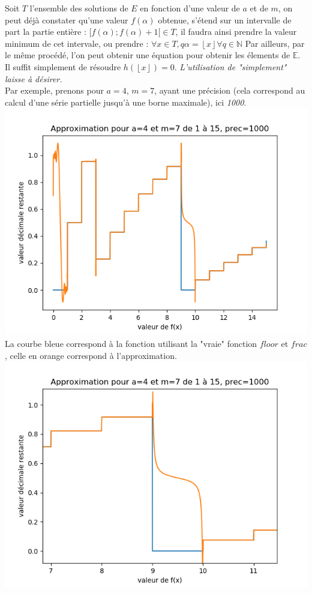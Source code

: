 \documentclass{article}
\begin{document}
Soit $T$ l'ensemble des solutions de $E$ en fonction d'une valeur de $a$ et de $m$, on peut déjà constater qu'une valeur $f(\alpha)$ obtenue, s'étend sur un intervalle de part la partie entière : $[f(\alpha) ; f(\alpha)+1[ \in T$, il faudra ainsi prendre la valeur minimum de cet intervale, ou prendre : $\forall x\in T, q\alpha = \left\lfloor x \right\rfloor \forall q\in\mathbb{N}$
Par ailleurs, par le même procédé, l'on peut obtenir une équation pour obtenir les élements de $\mathbb{E}$. Il suffit simplement de résoudre $h(\left\lfloor x \right\rfloor) = 0$. \emph{L'utilisation de "simplement" laisse à désirer.}\\
Par exemple, prenons pour $a=4$, $m=7$, ayant une précision (cela correspond au calcul d'une série partielle jusqu'à une borne maximale), ici \emph{1000}.
\includegraphics[scale=0.75]{images/Figure_5.png}\\
La courbe bleue correspond à la fonction utilisant la "vraie" fonction $floor$ et $frac$, celle en orange correspond à l'approximation.\\
\includegraphics[scale=0.75]{images/Figure_6.png}\\
\end{document}
